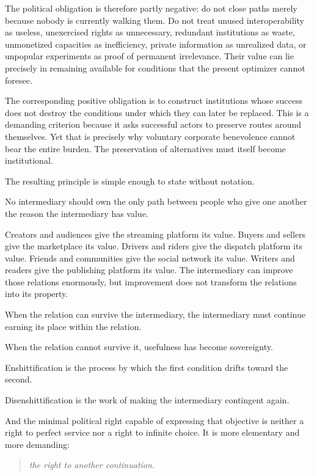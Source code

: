 \documentclass[11pt]{article}
\begin{document}
The political obligation is therefore partly negative: do not close paths merely because nobody is currently walking them. Do not treat unused interoperability as useless, unexercised rights as unnecessary, redundant institutions as waste, unmonetized capacities as inefficiency, private information as unrealized data, or unpopular experiments as proof of permanent irrelevance. Their value can lie precisely in remaining available for conditions that the present optimizer cannot foresee.

The corresponding positive obligation is to construct institutions whose success does not destroy the conditions under which they can later be replaced. This is a demanding criterion because it asks successful actors to preserve routes around themselves. Yet that is precisely why voluntary corporate benevolence cannot bear the entire burden. The preservation of alternatives must itself become institutional.

The resulting principle is simple enough to state without notation.

No intermediary should own the only path between people who give one another the reason the intermediary has value.

Creators and audiences give the streaming platform its value. Buyers and sellers give the marketplace its value. Drivers and riders give the dispatch platform its value. Friends and communities give the social network its value. Writers and readers give the publishing platform its value. The intermediary can improve those relations enormously, but improvement does not transform the relations into its property.

When the relation can survive the intermediary, the intermediary must continue earning its place within the relation.

When the relation cannot survive it, usefulness has become sovereignty.

Enshittification is the process by which the first condition drifts toward the second.

Disenshittification is the work of making the intermediary contingent again.

And the minimal political right capable of expressing that objective is neither a right to perfect service nor a right to infinite choice. It is more elementary and more demanding:

\begin{quote}
\emph{the right to another continuation.}
\end{quote}
\end{document}
